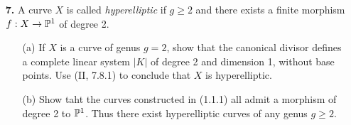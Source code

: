 \documentclass{article}
\begin{document}
\begin{enumerate} [label=\textbf{\arabic*.}, leftmargin=0em]
\item[\textbf{7.}] A curve $X$ is called \textit{hyperelliptic} if $g \geq 2$ and there exists a finite morphism $f : X \to \mathbb{P}^1$ of degree 2.
\begin{itemize}
  \item[(a)] If $X$ is a curve of genus $g = 2$, show that the canonical divisor defines a complete linear system $|K|$ of degree 2 and dimension 1, without base points. Use (II, 7.8.1) to conclude that $X$ is hyperelliptic.
  \item[(b)] Show taht the curves constructed in (1.1.1) all admit a morphism of degree 2 to $\mathbb{P}^1$. Thus there exist hyperelliptic curves of any genus $g \geq 2$.
\end{itemize}

\end{enumerate}
\end{document}

